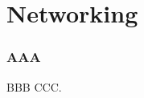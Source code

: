 \section[Networking]{Networking}
\label{sec:networking}
 

\begin{frame}
	\frametitle{AAA}

	\begin{block}{BBB}
		CCC.
	\end{block}

\end{frame}